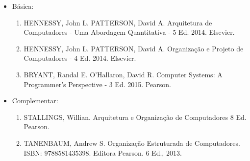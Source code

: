 \begin{itemize} 
  \item Básica:
	\begin{enumerate}
	\item HENNESSY, John L. PATTERSON, David A. Arquitetura de Computadores - Uma Abordagem Quantitativa - 5 Ed. 2014. Elsevier.
	\item HENNESSY, John L. PATTERSON, David A. Organização e Projeto de Computadores - 4 Ed. 2014. Elsevier.
	\item BRYANT, Randal E. O’Hallaron, David R. Computer Systems: A Programmer's Perspective - 3 Ed. 2015. Pearson.
	\end{enumerate}
  \item Complementar:
	\begin{enumerate} 
	\item STALLINGS, Willian. Arquitetura e Organização de Computadores 8 Ed. Pearson.
	\item TANENBAUM, Andrew S. Organização Estruturada de Computadores. ISBN: 9788581435398. Editora Pearson. 6 Ed., 2013.
	\end{enumerate}
\end{itemize}
